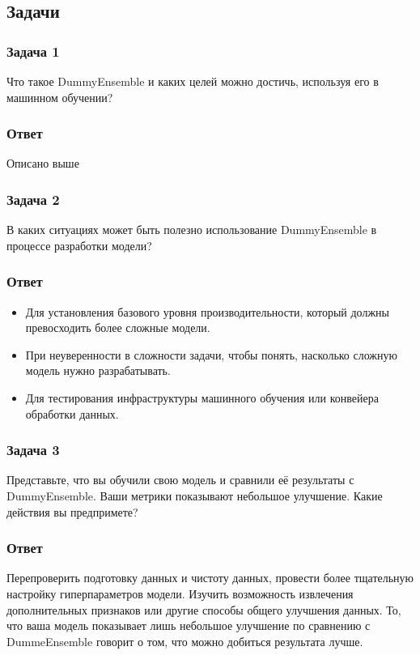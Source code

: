 \subsection*{Задачи}
\subsubsection*{Задача 1}
Что такое DummyEnsemble и каких целей можно достичь, используя его в машинном обучении?
\subsubsection*{Ответ}
Описано выше
\subsubsection*{Задача 2}
В каких ситуациях может быть полезно использование DummyEnsemble в процессе разработки модели?
\subsubsection*{Ответ}
\begin{itemize}
    \item Для установления базового уровня производительности, который должны превосходить более сложные модели.
    \item При неуверенности в сложности задачи, чтобы понять, насколько сложную модель нужно разрабатывать.
    \item Для тестирования инфраструктуры машинного обучения или конвейера обработки данных.
\end{itemize}
\subsubsection*{Задача 3}
Представьте, что вы обучили свою модель и сравнили её результаты с DummyEnsemble. Ваши метрики показывают небольшое улучшение. Какие действия вы предпримете?
\subsubsection*{Ответ}
Перепроверить подготовку данных и чистоту данных, провести более тщательную настройку гиперпараметров модели. Изучить возможность извлечения дополнительных признаков или другие способы общего улучшения данных. То, что ваша модель показывает лишь небольшое улучшение по сравнению с DummeEnsemble говорит о том, что можно добиться результата лучше.
